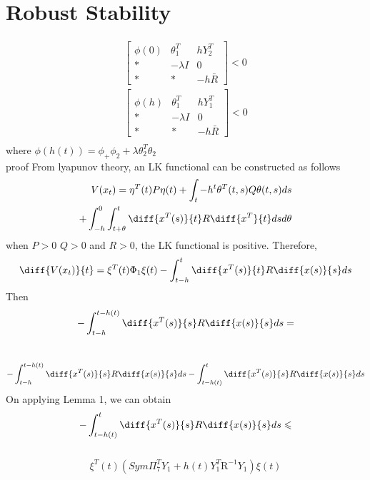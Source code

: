 \documentclass[journal]{IEEEtran}
\begin{document}
\section{Robust Stability}
  \begin{align}
  \begin{bmatrix}
     \phi(0)&\theta _1^T&hY_2^T\\
     *&-\lambda I&0\\
     *& * & -h\bar{R}
   \end{bmatrix} < 0 \\
  \begin{bmatrix} \\
     \phi(h)&\theta _1^T&hY_1^T\\
     *&-\lambda I&0\\
     *& * & -h\bar{R}
   \end{bmatrix} < 0 \\
 \end{align}
where $\phi(h(t))=\phi _+ \phi _2 + \lambda \theta _2^T \theta _2$   
\\
proof
From lyapunov theory, an LK functional can be constructed as follows
\begin{align}
  V(x_t) = \eta ^T (t)P \eta(t) + \int _t-h^t \theta ^T(t,s)Q\theta(t,s)ds  \\ +\int _{-h} ^0 \int _{t+\theta}^t\diff{x^T(s)}{t}R\diff{x^T}{t}dsd\theta
\end{align}
when $P>0$ $Q> 0$ and $R>0$, the LK functional is positive. 
Therefore,
\begin{equation}
  \diff{V(x_t)}{t}= \xi ^T (t)\Phi _1 \xi (t) - \int _{t-h}^t \diff{x^T(s)}{t}R\diff{x(s)}{s} ds
\end{equation}
Then 
 \begin{equation}
   - \int ^{t-h(t)}_{t-h}\diff{x^T(s)}{s}R\diff{x(s)}{s}ds =
\end{equation}
\\
\begin{equation}
 -\int^{t-h(t)}_{t-h}\diff{x^T(s)}{s}R\diff{x(s)}{s}ds   -\int^{t}_{t-h(t)}\diff{x^T(s)}{s}R\diff{x(s)}{s}ds
 \end{equation}
On applying Lemma 1, we can obtain 
\begin{equation}
 -\int^{t}_{t-h(t)}\diff{x^T(s)}{s}R\diff{x(s)}{s}ds \leqslant 
\end{equation}
\\
\begin{equation}
\xi ^T (t)(Sym{\Pi^{T}_{7}Y_1} + h(t)Y^{T}_{1}\text{\~{R}}^{-1}Y_1)\xi (t)
\end{equation}
\end{document}
